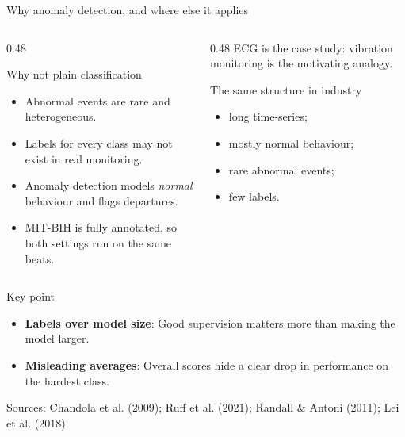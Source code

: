 \documentclass[aspectratio=169,10pt]{beamer}
\newcommand{\sources}[1]{%
  \vfill
  {\tiny\color{gray}Sources: #1}
}
\newcommand{\keypoint}[1]{%
  \vspace{0.4em}
  \begin{alertblock}{Key point}
    #1
  \end{alertblock}
}
\begin{document}
\begin{frame}{Why anomaly detection, and where else it applies}

  \begin{columns}[T]

    \begin{column}{0.48\textwidth}
      \begin{block}{Why not plain classification}
        \begin{itemize}
          \item Abnormal events are rare and heterogeneous.
          \item Labels for every class may not exist in real monitoring.
          \item Anomaly detection models \emph{normal} behaviour and flags departures.
          \item MIT-BIH is fully annotated, so both settings run on the same beats.
        \end{itemize}
      \end{block}
    \end{column}

    \begin{column}{0.48\textwidth}
      ECG is the case study: vibration monitoring is the motivating analogy.

      \begin{block}{The same structure in industry}
        \begin{itemize}
          \item long time-series;
          \item mostly normal behaviour;
          \item rare abnormal events;
          \item few labels.
        \end{itemize}
      \end{block}
    \end{column}

  \end{columns}

  \keypoint{
  \begin{itemize}
    \item \textbf{Labels over model size}: Good supervision matters more than making the model larger.
    \item \textbf{Misleading averages}: Overall scores hide a clear drop in performance on the hardest class.
  \end{itemize}
  }

  \sources{Chandola et al. (2009); Ruff et al. (2021); Randall \& Antoni (2011); Lei et al. (2018).}

\end{frame}
\end{document}
